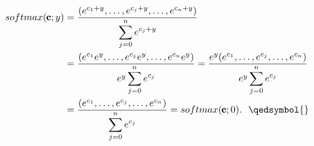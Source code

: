 \documentclass{exam}
\begin{document}
\begin{equation*}
    \begin{aligned}
        \displaystyle softmax(\pmb{\text{c}};y) &= \frac{(e^{c_1 + y}, \ldots ,e^{c_j + y}, \ldots ,e^{c_n + y} )}{\displaystyle\sum^{n}_{j = 0 }e^{c_j + y}} \\
                    &=\frac{(e^{c_1} e^{y}, \ldots ,e^{c_j} e^{y}, \ldots ,e^{c_n} e^{y} )}{e^{y}\displaystyle\sum^{n}_{j = 0 }e^{c_j}} = \frac{e^{y}(e^{c_1} , \ldots ,e^{c_j}, \ldots ,e^{c_n})}{e^{y}\displaystyle\sum^{n}_{j = 0 }e^{c_j}} \\
                    &= \frac{(e^{c_1}, \ldots ,e^{c_j}, \ldots ,e^{c_n} )}{\displaystyle\sum^{n}_{j = 0 }e^{c_j}} = softmax(\pmb{\text{c}};0).\ \ \qedsymbol{}
    \end{aligned}    
\end{equation*}
\end{document}

